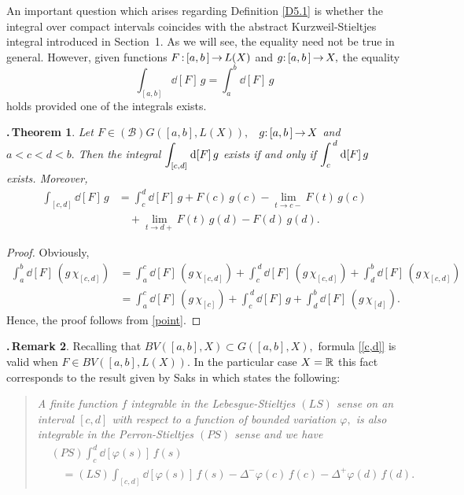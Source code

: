 \documentclass[12pt,twoside]{article}
\numberwithin{equation}{section}
\theoremstyle{plain}
\newtheorem{theorem}{\hskip-1mm.\,Theorem}[section]
\theoremstyle{definition}
\newtheorem{remark}[theorem]{\hskip-1mm.\,Remark}
\begin{document}
{\smallskip

An important question which arises regarding Definition \ref{D5.1} is whether the integral
over compact intervals coincides with the abstract Kurzweil-Stieltjes integral introduced
in Section~1. As we will see, the equality need not be true in general. However, given
functions $F\,{:}\,[a,b\,]\,{\to}\,L(X)$ and $g{:}\,[a,b\,]\,{\to}\,X,$ the equality
\[
  \int_{[a,b]}\dd[F]\,g=\int_{a}^{b}\dd[F]\,g
\]
holds provided one of the integrals exists.

\smallskip

\begin{theorem}\label{compact}
Let $F\in(\mathcal{B})G([a,b],L(X)),$ \ $g{:}\,[a,b\,]\,{\to}\,X$ and $a<c<d<b.$
Then the integral $\displaystyle\int_{[c,d]}\hskip0.2mm\mbox{\rm d}[F]\,g$ exists if and only if
$\displaystyle\int_c^{\,d}\hskip0.2mm\mbox{\rm d}[F]\,g$ exists. Moreover,
\begin{align}\label{[c,d]}
     \int_{[c,d]}\dd[F]\,g
   &=\int_{c}^{d}\dd[F]\,g+F(c)\,g(c)-\lim_{t\to c-}F(t)\,g(c)
  \\\nonumber
   &\quad+\lim_{t\to d+}F(t)\,g(d)-F(d)\,g(d).
\end{align}
\end{theorem}
\begin{proof}
Obviously,
\begin{align*}
     \int_a^b\dd[F]\,(g\,\chi_{[c,d]})
   &=\int_a^c\dd[F]\,(g\,\chi_{[c,d]})+\int_c^{\,d}\dd[F]\,(g\,\chi_{[c,d]})
                                                    +\int_d^b\dd[F]\,(g\,\chi_{[c,d]})
  \\
   &=\int_a^c\dd[F]\,(g\,\chi_{[c]})+\int_c^{\,d}\dd[F]\,g+\int_d^b\dd[F]\,(g\,\chi_{[d]}).
\end{align*}
Hence, the proof follows from \eqref{point}.
\end{proof}

\smallskip

\begin{remark}
Recalling that $BV([a,b],X)\subset G([a,b],X),$ formula \eqref{[c,d]} is valid when
$F\in BV([a,b],L(X)).$ In the particular case $X={\mathbb R}$ this fact corresponds to the result
given by Saks in \cite[Theorem VI.(8.1) (p.~208)]{S} which states the following:
\begin{quote}
  \textit{A finite function $f$ integrable in the Lebesgue-Stieltjes $(LS)$ sense on
  an interval $[c,d]$ with respect to a function of bounded variation $\varphi,$ is also
  integrable in the Perron-Stieltjes $(PS)$ sense and we have}
\begin{align*}
     &(PS)\int_{c}^{d}\dd\left[\varphi(s)\right]\,f(s)
   \\
     &\quad=(LS)\int_{[c,d]}\dd\left[\varphi(s)\right]\,f(s)
            -\Delta^{-}\varphi(c)\,f(c)
			-\Delta^{+}\varphi(d)\,f(d).
  \end{align*}
\end{quote}
\end{remark}

}
\end{document}
